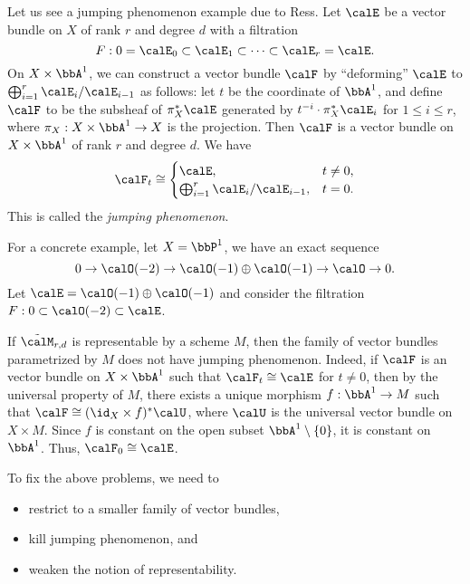     \begin{example}\label{eg:Ress_construction}
        Let us see a jumping phenomenon example due to Ress.
        Let \(\calE\) be a vector bundle on \(X\) of rank \(r\) and degree \(d\) with a filtration
        \[F: 0 = \calE_0 \subset \calE_1 \subset \cdots \subset \calE_r = \calE. \]
        On \(X \times \bbA^1\), we can construct a vector bundle \(\calF\) by ``deforming'' \(\calE\) to \(\bigoplus_{i=1}^r \calE_i/\calE_{i-1}\) as follows:
        let \(t\) be the coordinate of \(\bbA^1\), 
        and define \(\calF\) to be the subsheaf of \(\pi_X^* \calE\) generated by \(t^{-i} \cdot \pi_X^* \calE_i\) for \(1 \leq i \leq r\), where \(\pi_X : X \times \bbA^1 \to X\) is the projection.
        Then \(\calF\) is a vector bundle on \(X \times \bbA^1\) of rank \(r\) and degree \(d\).
        We have 
        \[ \calF_t \cong \begin{cases}
            \calE, & t \neq 0, \\
            \bigoplus_{i=1}^r \calE_i/\calE_{i-1}, & t = 0.
        \end{cases} \]
        This is called the \emph{jumping phenomenon}.

        For a concrete example, let \(X = \bbP^1\), we have an exact sequence
        \[ 0 \to \calO(-2) \to \calO(-1) \oplus \calO(-1) \to \calO \to 0. \]
        Let \(\calE = \calO(-1) \oplus \calO(-1)\) and consider the filtration \(F : 0 \subset \calO(-2) \subset \calE\).
    \end{example}

    If \(\tilde{\calM}_{r,d}\) is representable by a scheme \(M\), then the family of vector bundles parametrized by \(M\) does not have jumping phenomenon.
    Indeed, if \(\calF\) is an vector bundle on \(X \times \bbA^1\) such that \(\calF_t \cong \calE\) for \(t \neq 0\), 
    then by the universal property of \(M\), there exists a unique morphism \(f : \bbA^1 \to M\) such that \(\calF \cong (\id_X \times f)^* \calU\), 
    where \(\calU\) is the universal vector bundle on \(X \times M\).
    Since \(f\) is constant on the open subset \(\bbA^1 \setminus \{0\}\), it is constant on \(\bbA^1\).
    Thus, \(\calF_0 \cong \calE\).

    To fix the above problems, we need to 
    \begin{itemize}
        \item restrict to a smaller family of vector bundles,
        \item kill jumping phenomenon, and
        \item weaken the notion of representability.
    \end{itemize}


